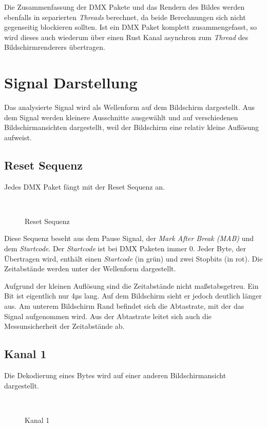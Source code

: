Die Zusammenfassung der DMX Pakete und das Rendern des Bildes werden ebenfalls in separierten \emph{Threads} berechnet, da beide Berechnungen sich nicht gegenseitig blockieren sollten. Ist ein DMX Paket komplett zusammengefasst, so wird dieses auch wiederum über einen Rust Kanal asynchron zum \emph{Thread} des Bildschirmrenderers übertragen.  

\section{Signal Darstellung}
Das analysierte Signal wird als Wellenform auf dem Bildschirm dargestellt.
Aus dem Signal werden kleinere Ausschnitte ausgewählt und auf verschiedenen Bildschirmansichten dargestellt, weil der Bildschirm eine relativ kleine Auflösung aufweist.

\subsection{Reset Sequenz}
Jedes DMX Paket fängt mit der Reset Sequenz an.

\begin{figure}[H]
	\centering
	\\
	\caption{Reset Sequenz}
\end{figure}
Diese Sequenz beseht aus dem Pause Signal, der \emph{Mark After Break (MAB)} und dem \emph{Startcode}. Der \emph{Startcode} ist bei DMX Paketen immer 0. Jeder Byte, der Übertragen wird, enthält einen \emph{Startcode} (in grün) und zwei Stopbits (in rot). Die Zeitabstände werden unter der Wellenform dargestellt.

Aufgrund der kleinen Auflösung sind die Zeitabstände nicht maßstabsgetreu. Ein Bit ist eigentlich nur 4µs lang. Auf dem Bildschirm sieht er jedoch deutlich länger aus. Am unterem Bildschirm Rand befindet sich die Abtastrate, mit der das Signal aufgenommen wird. Aus der Abtastrate leitet sich auch die Messunsicherheit der Zeitabstände ab.

\subsection{Kanal 1}

Die Dekodierung eines Bytes wird auf einer anderen Bildschirmansicht dargestellt.

\begin{figure}[H]
	\centering
	\\
	\caption{Kanal 1}
\end{figure}

